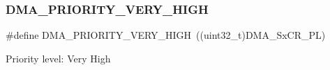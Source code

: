 \subsubsection{\texorpdfstring{D\+M\+A\+\_\+\+P\+R\+I\+O\+R\+I\+T\+Y\+\_\+\+V\+E\+R\+Y\+\_\+\+H\+I\+GH}{DMA\_PRIORITY\_VERY\_HIGH}}
{\footnotesize\ttfamily \#define D\+M\+A\+\_\+\+P\+R\+I\+O\+R\+I\+T\+Y\+\_\+\+V\+E\+R\+Y\+\_\+\+H\+I\+GH~((uint32\+\_\+t)D\+M\+A\+\_\+\+Sx\+C\+R\+\_\+\+PL)}

Priority level\+: Very High 